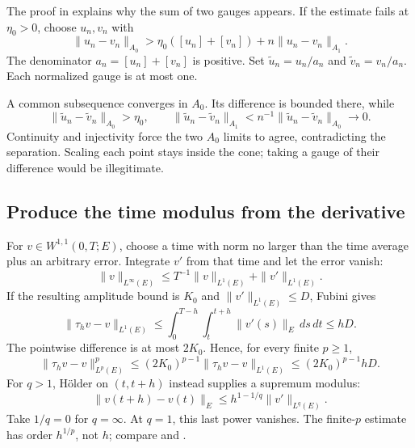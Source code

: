 \documentclass[12pt,reqno]{amsart}
\begin{document}
The proof in \cite[Lemma 1, pp.~4--5]{S-barrett-suli} explains why the sum of two gauges appears. If the estimate fails at $\eta_0>0$, choose $u_n,v_n$ with
\[
\|u_n-v_n\|_{A_0}>
\eta_0([u_n]+[v_n])+n\|u_n-v_n\|_{A_1}.
\]
The denominator $a_n=[u_n]+[v_n]$ is positive. Set $\widetilde u_n=u_n/a_n$ and $\widetilde v_n=v_n/a_n$. Each normalized gauge is at most one.

A common subsequence converges in $A_0$. Its difference is bounded there, while
\[
\|\widetilde u_n-\widetilde v_n\|_{A_0}>\eta_0,
\qquad
\|\widetilde u_n-\widetilde v_n\|_{A_1}
<n^{-1}\|\widetilde u_n-\widetilde v_n\|_{A_0}\longrightarrow0.
\]
Continuity and injectivity force the two $A_0$ limits to agree, contradicting the separation. Scaling each point stays inside the cone; taking a gauge of their difference would be illegitimate.
\subsection{Produce the time modulus from the derivative}

For $v\in W^{1,1}(0,T;E)$, choose a time with norm no larger than the time average plus an arbitrary error. Integrate $v'$ from that time and let the error vanish:
\begin{equation}\label{eq:w11}
\|v\|_{L^\infty(E)}\le T^{-1}\|v\|_{L^1(E)}+\|v'\|_{L^1(E)}.
\end{equation}
If the resulting amplitude bound is $K_0$ and $\|v'\|_{L^1(E)}\le D$, Fubini gives
\begin{equation}\label{eq:l1shift}
\|\tau_hv-v\|_{L^1(E)}
\le\int_0^{T-h}\int_t^{t+h}\|v'(s)\|_E\,ds\,dt\le hD.
\end{equation}
The pointwise difference is at most $2K_0$. Hence, for every finite $p\ge1$,
\begin{equation}\label{eq:pshift}
\|\tau_hv-v\|_{L^p(E)}^p
\le(2K_0)^{p-1}\|\tau_hv-v\|_{L^1(E)}
\le(2K_0)^{p-1}hD.
\end{equation}
For $q>1$, H\"older on $(t,t+h)$ instead supplies a supremum modulus:
\begin{equation}\label{eq:supshift}
\|v(t+h)-v(t)\|_E\le h^{1-1/q}\|v'\|_{L^q(E)}.
\end{equation}
Take $1/q=0$ for $q=\infty$. At $q=1$, this last power vanishes. The finite-$p$ estimate has order $h^{1/p}$, not $h$; compare \cite[Lemma 4, pp.~77--78]{S-simon} and \cite[Corollary 2.4, p.~1730]{S-maitre}.
\end{document}
